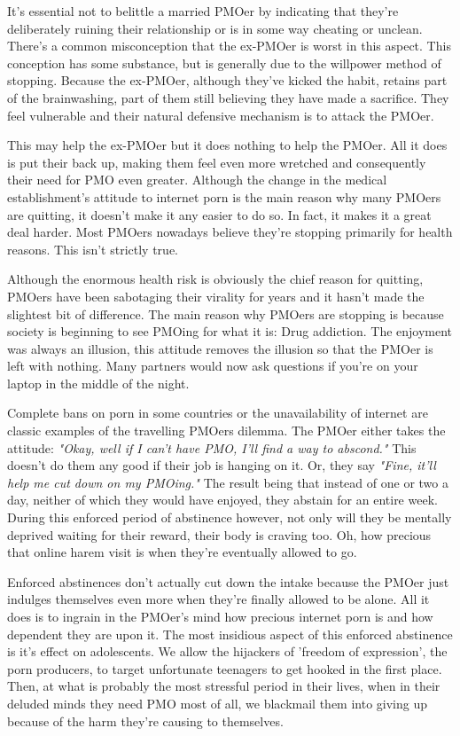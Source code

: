 \documentclass[easypeasy.tex]{subfiles}
\begin{document}
It's essential not to belittle a married PMOer by indicating that they're deliberately ruining their relationship or is in some way cheating or unclean. There's a common misconception that the ex-PMOer is worst in this aspect. This conception has some substance, but is generally due to the willpower method of stopping. Because the ex-PMOer, although they've kicked the habit, retains part of the brainwashing, part of them still believing they have made a sacrifice. They feel vulnerable and their natural defensive mechanism is to attack the PMOer.

This may help the ex-PMOer but it does nothing to help the PMOer. All it does is put their back up, making them feel even more wretched and consequently their need for PMO even greater. Although the change in the medical establishment's attitude to internet porn is the main reason why many PMOers are quitting, it doesn't make it any easier to do so. In fact, it makes it a great deal harder. Most PMOers nowadays believe they're stopping primarily for health reasons. This isn't strictly true.

Although the enormous health risk is obviously the chief reason for quitting, PMOers have been sabotaging their virality for years and it hasn't made the slightest bit of difference. The main reason why PMOers are stopping is because society is beginning to see PMOing for what it is: Drug addiction. The enjoyment was always an illusion, this attitude removes the illusion so that the PMOer is left with nothing. Many partners would now ask questions if you're on your laptop in the middle of the night.

Complete bans on porn in some countries or the unavailability of internet are classic examples of the travelling PMOers dilemma. The PMOer either takes the attitude: \textit{"Okay, well if I can't have PMO, I'll find a way to abscond."} This doesn't do them any good if their job is hanging on it. Or, they say \textit{"Fine, it'll help me cut down on my PMOing."} The result being that instead of one or two a day, neither of which they would have enjoyed, they abstain for an entire week. During this enforced period of abstinence however, not only will they be mentally deprived waiting for their reward, their body is craving too. Oh, how precious that online harem visit is when they're eventually allowed to go.

Enforced abstinences don't actually cut down the intake because the PMOer just indulges themselves even more when they're finally allowed to be alone. All it does is to ingrain in the PMOer's mind how precious internet porn is and how dependent they are upon it. The most insidious aspect of this enforced abstinence is it's effect on adolescents. We allow the hijackers of 'freedom of expression', the porn producers, to target unfortunate teenagers to get hooked in the first place. Then, at what is probably the most stressful period in their lives, when in their deluded minds they need PMO most of all, we blackmail them into giving up because of the harm they're causing to themselves.
\end{document}

